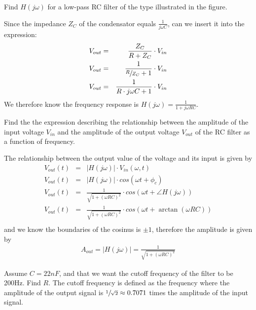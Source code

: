 \documentclass{../../myassignment}
\begin{document}
	\begin{problem}
		Find $H(j\omega)$ for a low-pass RC filter of the type illustrated in the figure.
	\end{problem}

	\begin{answer}
		Since the impedance $Z_C$ of the condensator equals $\frac{1}{j\omega C}$, can we insert it into the expression:
		\begin{eqnarray*}
			V_{out} &=& \frac{Z_C}{R+Z_C} \cdot V_{in} \\
			V_{out} &=& \frac{1}{\sfrac{R}{Z_C}+1} \cdot V_{in} \\
			V_{out} &=& \frac{1}{R\cdot {j\omega C}+1} \cdot V_{in} \\
		\end{eqnarray*}
		We therefore know the frequency response is $H(j\omega) = \frac{1}{1+j\omega RC}$.
	\end{answer}

	\begin{problem}
		Find the the expression describing the relationship between the amplitude of the input voltage $V_{in}$ and the amplitude of the output voltage $V_{out}$ of the RC filter as a function of frequency.
	\end{problem}

	\begin{answer}
		The relationship between the output value of the voltage and its input is given by
		\begin{eqnarray*}
			V_{out}(t) &=& |H(j\omega)|\cdot V_{in}(\omega, t)\\
			V_{out}(t) &=& |H(j\omega)|\cdot cos(\omega t + \phi_c)\\
			V_{out}(t) &=& \frac{1}{\sqrt{1+(\omega RC)^2}}\cdot cos(\omega t + \angle H(j\omega))\\
			V_{out}(t) &=& \frac{1}{\sqrt{1+(\omega RC)^2}}\cdot cos(\omega t + \arctan(\omega RC))\\
		\end{eqnarray*}
		and we know the boundaries of the cosinus is $\pm 1$, therefore the amplitude is given by
			\begin{eqnarray*}
				A_{out} = |H(j\omega)| = \frac{1}{\sqrt{1+(\omega RC)^2}}
			\end{eqnarray*}

	\end{answer}

	\newpage

	\begin{problem}
		Assume $C=22nF$, and that we want the cutoff frequency of the filter to be 200Hz. Find $R$. The cutoff frequency is defined as the frequency where the amplitude of the output signal is $\sfrac{1}{\sqrt{2}}\approx 0.7071$ times the amplitude of the input signal.
	\end{problem}
\end{document}
